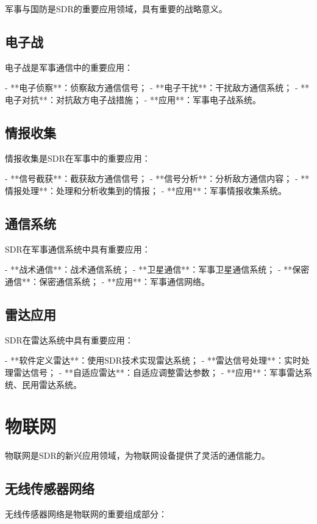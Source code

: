 ﻿\documentclass[UTF8]{ctexbook}
\begin{document}
军事与国防是SDR的重要应用领域，具有重要的战略意义。

\subsection{电子战}

电子战是军事通信中的重要应用：

- **电子侦察**：侦察敌方通信信号；
- **电子干扰**：干扰敌方通信系统；
- **电子对抗**：对抗敌方电子战措施；
- **应用**：军事电子战系统。

\subsection{情报收集}

情报收集是SDR在军事中的重要应用：

- **信号截获**：截获敌方通信信号；
- **信号分析**：分析敌方通信内容；
- **情报处理**：处理和分析收集到的情报；
- **应用**：军事情报收集系统。

\subsection{通信系统}

SDR在军事通信系统中具有重要应用：

- **战术通信**：战术通信系统；
- **卫星通信**：军事卫星通信系统；
- **保密通信**：保密通信系统；
- **应用**：军事通信网络。

\subsection{雷达应用}

SDR在雷达系统中具有重要应用：

- **软件定义雷达**：使用SDR技术实现雷达系统；
- **雷达信号处理**：实时处理雷达信号；
- **自适应雷达**：自适应调整雷达参数；
- **应用**：军事雷达系统、民用雷达系统。

\section{物联网}

物联网是SDR的新兴应用领域，为物联网设备提供了灵活的通信能力。

\subsection{无线传感器网络}

无线传感器网络是物联网的重要组成部分：
\end{document}
